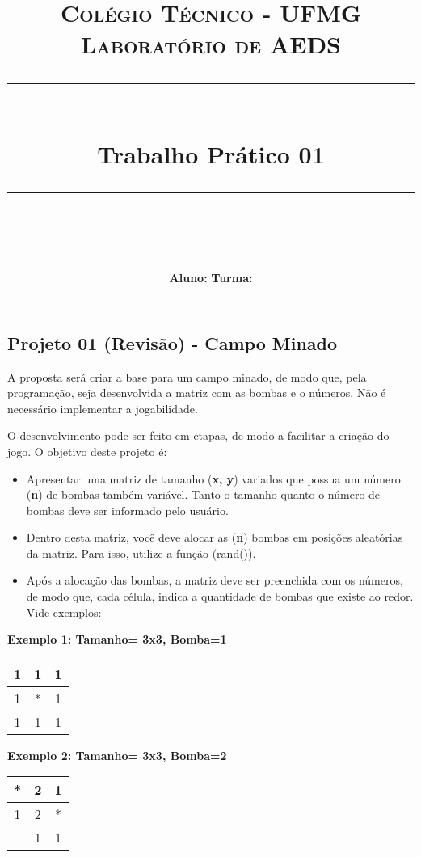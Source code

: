 \documentclass[a4paper]{exam}
\title{
	\normalfont \normalsize 
	\textsc{Colégio Técnico - UFMG \\ 
		Laboratório de AEDS} \\
	\rule{\linewidth}{0.5pt} \\
	\huge Trabalho Prático 01 \\
	\rule{\linewidth}{2pt} \\
}
\author{\textbf{Aluno:} \hspace{10cm} \textbf{Turma:}}
\date{}
\begin{document}
\maketitle

\begin{center}
	\section*{Projeto 01 (Revisão) - Campo Minado}
\end{center}

A proposta será criar a base para um campo minado, de modo que, pela programação, seja desenvolvida a matriz com as bombas e o números. Não é necessário implementar a jogabilidade.

O desenvolvimento pode ser feito em etapas, de modo a facilitar a criação do jogo. O objetivo deste projeto é:

\begin{itemize}
	\item Apresentar uma matriz de tamanho (\textbf{x, y}) variados que possua um número (\textbf{n}) de bombas também variável. Tanto o tamanho quanto o número de bombas deve ser informado pelo usuário.
	\item Dentro desta matriz, você deve alocar as (\textbf{n}) bombas em posições aleatórias da matriz. Para isso, utilize a função (\href{https://www.cplusplus.com/reference/cstdlib/rand/}{rand()}).
	\item Após a alocação das bombas, a matriz deve ser preenchida com os números, de modo que, cada célula, indica a quantidade de bombas que existe ao redor. Vide exemplos:
\end{itemize}

\centering
\textbf{Exemplo 1: Tamanho= 3x3, Bomba=1}
\begin{table}[H]
	\centering
	\begin{tabular}{|c|c|c|}
		\hline
		1 & 1 & 1 \\ \hline
		1 & * & 1 \\ \hline
		1 & 1 & 1 \\ \hline
	\end{tabular}
\end{table}

\textbf{Exemplo 2: Tamanho= 3x3, Bomba=2}
\begin{table}[H]
	\centering
	\begin{tabular}{|c|c|c|}
		\hline
		* & 2 & 1 \\ \hline
		1 & 2 & * \\ \hline
		& 1 & 1 \\ \hline
	\end{tabular}
\end{table}
\end{document}
